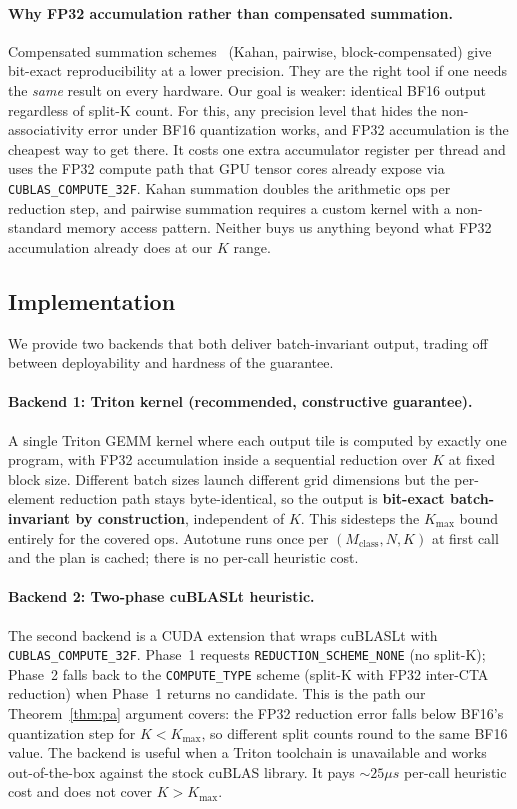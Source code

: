 \documentclass{article}
\begin{document}
\paragraph{Why FP32 accumulation rather than compensated summation.}
Compensated summation schemes~\citep{demmel2013accurate,rump2010accurate} (Kahan,
pairwise, block-compensated) give bit-exact reproducibility at a lower precision.
They are the right tool if one needs the \emph{same} result on every hardware.
Our goal is weaker: identical BF16 output regardless of split-K count. For this,
any precision level that hides the non-associativity error under BF16 quantization
works, and FP32 accumulation is the cheapest way to get there. It costs one
extra accumulator register per thread and uses the FP32 compute path that GPU
tensor cores already expose via \texttt{CUBLAS\_COMPUTE\_32F}. Kahan summation
doubles the arithmetic ops per reduction step, and pairwise summation requires
a custom kernel with a non-standard memory access pattern. Neither buys us
anything beyond what FP32 accumulation already does at our $K$ range.

\subsection{Implementation}
\label{sec:impl}

We provide two backends that both deliver batch-invariant output, trading off
between deployability and hardness of the guarantee.

\paragraph{Backend 1: Triton kernel (recommended, constructive guarantee).}
A single Triton GEMM kernel where each output tile is computed by exactly one
program, with FP32 accumulation inside a sequential reduction over $K$ at fixed
block size. Different batch sizes launch different grid dimensions but the
per-element reduction path stays byte-identical, so the output is
\textbf{bit-exact batch-invariant by construction}, independent of $K$.
This sidesteps the $K_{\max}$ bound entirely for the covered ops. Autotune runs
once per $(M_{\text{class}}, N, K)$ at first call and the plan is cached; there
is no per-call heuristic cost.

\paragraph{Backend 2: Two-phase cuBLASLt heuristic.}
The second backend is a CUDA extension that wraps cuBLASLt with
\texttt{CUBLAS\_COMPUTE\_32F}. Phase~1 requests \texttt{REDUCTION\_SCHEME\_NONE}
(no split-K); Phase~2 falls back to the \texttt{COMPUTE\_TYPE} scheme (split-K
with FP32 inter-CTA reduction) when Phase~1 returns no candidate. This is the
path our Theorem~\ref{thm:pa} argument covers: the FP32 reduction error falls
below BF16's quantization step for $K<K_{\max}$, so different split counts round
to the same BF16 value. The backend is useful when a Triton toolchain is
unavailable and works out-of-the-box against the stock cuBLAS library. It pays
$\sim 25\mu s$ per-call heuristic cost and does not cover $K>K_{\max}$.
\end{document}
